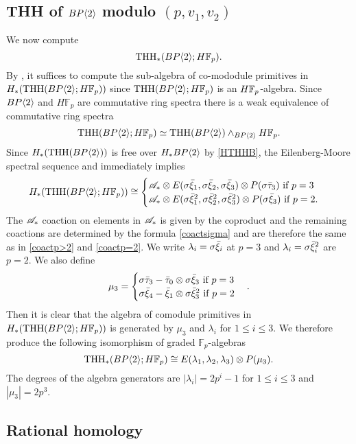 \subsection{THH of $BP\langle 2 \rangle$ modulo $(p,v_1,v_2)$}
We now compute %
\[\operatorname{THH}_*(BP\langle 2 \rangle;H\mathbb{F}_p).\] 
By \cite[Lem. 4.1]{AngeltveitRognes}, it suffices to compute the sub-algebra of co-mododule primitives in $H_*(\operatorname{THH}(BP\langle 2 \rangle;H\mathbb{F}_p))$ since $\operatorname{THH}(BP\langle 2 \rangle;H\mathbb{F}_p)$ is an $H\mathbb{F}_p$-algebra. Since $BP\langle 2 \rangle$ and $H\mathbb{F}_p$ are commutative ring spectra there is a weak equivalence of commutative ring spectra
\[ \operatorname{THH}(BP\langle 2 \rangle;H\mathbb{F}_p)\simeq \operatorname{THH}(BP\langle 2 \rangle)\wedge_{BP\langle 2 \rangle} H\mathbb{F}_p. \] 
Since $H_*(\operatorname{THH}(BP\langle 2 \rangle))$ is free over $H_*BP\langle 2 \rangle$ by \eqref{HTHHB}, the Eilenberg-Moore spectral sequence and \cite[Cor. 5.13]{AngeltveitRognes} immediately implies
\begin{equation}\label{eqn:HTHH(R;F_p)}
H_*(\operatorname{THH}(BP\langle 2 \rangle;H\mathbb{F}_p))\cong \begin{cases} \mathscr{A}_* \otimes E(\sigma \bar{\xi}_1, \sigma \bar{\xi}_2, \sigma \bar{\xi}_3)\otimes P(\sigma \bar{\tau}_3) \text{ if } p=3 \\  \mathscr{A}_* \otimes E(\sigma \bar{\xi}_1^2, \sigma \bar{\xi}_2^2, \sigma \bar{\xi}_3^2)\otimes P(\sigma \bar{\xi}_3) \text{ if } p=2. \end{cases}
\end{equation}
The $\mathscr{A}_*$ coaction on elements in $\mathscr{A}_*$ is given by the coproduct and the remaining coactions are determined by the formula \eqref{coactsigma} and are therefore the same as in \eqref{coactp>2} and \eqref{coactp=2}. We write $\lambda_i=\sigma\bar{\xi}_i$ at $p=3$ and $\lambda_i=\sigma \bar{\xi}_i^2$ are $p=2$. We also define 
\[ \mu_3=\begin{cases} \sigma \bar{\tau}_3 -\bar{\tau}_0\otimes \sigma \bar{\xi}_3 \text{ if } p=3 \\ \sigma \bar{\xi}_4-\bar{\xi}_1\otimes \sigma \bar{\xi}^2_3 \text{ if } p=2 \end{cases}. \]
Then it is clear that the algebra of comodule primitives in $H_*(\operatorname{THH}(BP\langle 2 \rangle ;H\mathbb{F}_p))$ is generated by $\mu_3$ and $\lambda_i$ for $1\le i\le 3$. We therefore produce the following isomorphism of graded $\mathbb{F}_p$-algebras
\begin{equation}\label{eqn:THH(R;F_p)}
\operatorname{THH}_*(BP\langle 2 \rangle;H\mathbb{F}_p)\cong E(\lambda_1, \lambda_2, \lambda_3)\otimes P(\mu_3).
\end{equation}
The degrees of the algebra generators are $|\lambda_i|=2p^i-1$ for $1\le i\le 3$ and $|\mu_3| = 2p^3$. 

\subsection{Rational homology}

